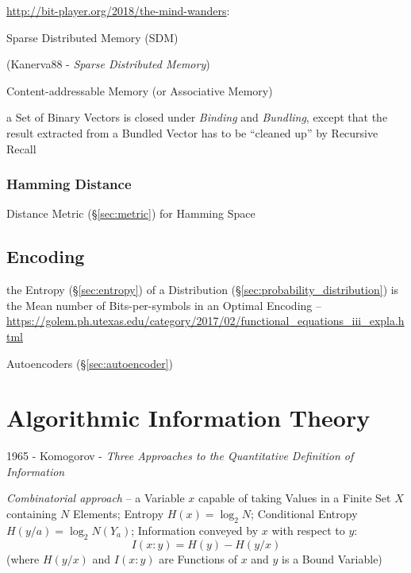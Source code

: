 
\url{http://bit-player.org/2018/the-mind-wanders}:

Sparse Distributed Memory (SDM)

(Kanerva88 - \emph{Sparse Distributed Memory})

Content-addressable Memory (or Associative Memory)

a Set of Binary Vectors is closed under \emph{Binding} and \emph{Bundling},
except that the result extracted from a Bundled Vector has to be ``cleaned up''
by Recursive Recall



\subsubsection{Hamming Distance}\label{sec:hamming_distance}

Distance Metric (\S\ref{sec:metric}) for Hamming Space



\subsection{Encoding}\label{sec:encoding}

the Entropy (\S\ref{sec:entropy}) of a Distribution
(\S\ref{sec:probability_distribution}) is the Mean number of
Bits-per-symbols in an Optimal Encoding --
\url{https://golem.ph.utexas.edu/category/2017/02/functional_equations_iii_expla.html}

\fist Autoencoders (\S\ref{sec:autoencoder})



\section{Algorithmic Information Theory}\label{sec:algorithmic_information}

1965 - Komogorov - \emph{Three Approaches to the Quantitative Definition of
  Information}

\emph{Combinatorial approach} -- a Variable $x$ capable of taking Values in a
Finite Set $X$ containing $N$ Elements; Entropy $H(x) = \log_2 N$; Conditional
Entropy $H(y/a) = \log_2 N(Y_a)$; Information conveyed by $x$ with respect to
$y$:
\[
  I(x:y) = H(y) - H(y/x)
\]
(where $H(y/x)$ and $I(x : y)$ are Functions of $x$ and $y$ is a Bound Variable)

